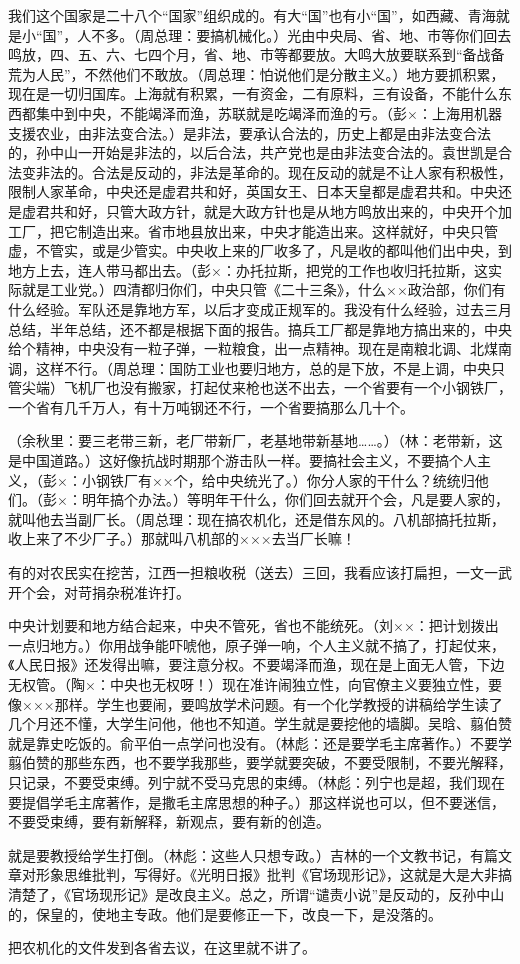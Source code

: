 我们这个国家是二十八个“国家”组织成的。有大“国”也有小“国”，如西藏、青海就是小“国”，人不多。（周总理：要搞机械化。）光由中央局、省、地、市等你们回去鸣放，四、五、六、七四个月，省、地、市等都要放。大鸣大放要联系到“备战备荒为人民”，不然他们不敢放。（周总理：怕说他们是分散主义。）地方要抓积累，现在是一切归国库。上海就有积累，一有资金，二有原料，三有设备，不能什么东西都集中到中央，不能竭泽而渔，苏联就是吃竭泽而渔的亏。（彭×：上海用机器支援农业，由非法变合法。）是非法，要承认合法的，历史上都是由非法变合法的，孙中山一开始是非法的，以后合法，共产党也是由非法变合法的。袁世凯是合法变非法的。合法是反动的，非法是革命的。现在反动的就是不让人家有积极性，限制人家革命，中央还是虚君共和好，英国女王、日本天皇都是虚君共和。中央还是虚君共和好，只管大政方针，就是大政方针也是从地方鸣放出来的，中央开个加工厂，把它制造出来。省市地县放出来，中央才能造出来。这样就好，中央只管虚，不管实，或是少管实。中央收上来的厂收多了，凡是收的都叫他们出中央，到地方上去，连人带马都出去。（彭×：办托拉斯，把党的工作也收归托拉斯，这实际就是工业党。）四清都归你们，中央只管《二十三条》，什么××政治部，你们有什么经验。军队还是靠地方军，以后才变成正规军的。我没有什么经验，过去三月总结，半年总结，还不都是根据下面的报告。搞兵工厂都是靠地方搞出来的，中央给个精神，中央没有一粒子弹，一粒粮食，出一点精神。现在是南粮北调、北煤南调，这样不行。（周总理：国防工业也要归地方，总的是下放，不是上调，中央只管尖端）飞机厂也没有搬家，打起仗来枪也送不出去，一个省要有一个小钢铁厂，一个省有几千万人，有十万吨钢还不行，一个省要搞那么几十个。

（余秋里：要三老带三新，老厂带新厂，老基地带新基地……。）（林：老带新，这是中国道路。）这好像抗战时期那个游击队一样。要搞社会主义，不要搞个人主义，（彭×：小钢铁厂有××个，给中央统光了。）你分人家的干什么？统统归他们。（彭×：明年搞个办法。）等明年干什么，你们回去就开个会，凡是要人家的，就叫他去当副厂长。（周总理：现在搞农机化，还是借东风的。八机部搞托拉斯，收上来了不少厂子。）那就叫八机部的×××去当厂长嘛！

有的对农民实在挖苦，江西一担粮收税（送去）三回，我看应该打扁担，一文一武开个会，对苛捐杂税准许打。

中央计划要和地方结合起来，中央不管死，省也不能统死。（刘××：把计划拨出一点归地方。）你用战争能吓唬他，原子弹一响，个人主义就不搞了，打起仗来，《人民日报》还发得出嘛，要注意分权。不要竭泽而渔，现在是上面无人管，下边无权管。（陶×：中央也无权呀！）现在准许闹独立性，向官僚主义要独立性，要像×××那样。学生也要闹，要鸣放学术问题。有一个化学教授的讲稿给学生读了几个月还不懂，大学生问他，他也不知道。学生就是要挖他的墙脚。吴晗、翦伯赞就是靠史吃饭的。俞平伯一点学问也没有。（林彪：还是要学毛主席著作。）不要学翦伯赞的那些东西，也不要学我那些，要学就要突破，不要受限制，不要光解释，只记录，不要受束缚。列宁就不受马克思的束缚。（林彪：列宁也是超，我们现在要提倡学毛主席著作，是撒毛主席思想的种子。）那这样说也可以，但不要迷信，不要受束缚，要有新解释，新观点，要有新的创造。

就是要教授给学生打倒。（林彪：这些人只想专政。）吉林的一个文教书记，有篇文章对形象思维批判，写得好。《光明日报》批判《官场现形记》，这就是大是大非搞清楚了，《官场现形记》是改良主义。总之，所谓“谴责小说”是反动的，反孙中山的，保皇的，使地主专政。他们是要修正一下，改良一下，是没落的。

把农机化的文件发到各省去议，在这里就不讲了。


